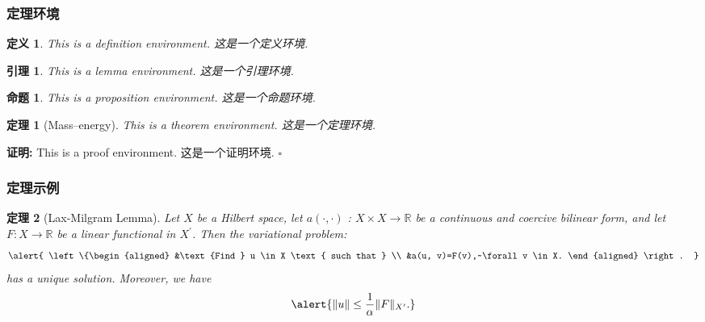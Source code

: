 \documentclass[notheorems,11pt,compress]{beamer}
\numberwithin{figure}{section}
\numberwithin{table}{section}
\numberwithin{equation}{section}
\theoremstyle{plain}
\newtheorem{theorem}{定理}
\numberwithin{theorem}{section}
\newtheorem{lemma}{引理}
\numberwithin{lemma}{section}
\numberwithin{corollary}{section}
\newtheorem{definition}{定义}
\numberwithin{definition}{section}
\newtheorem{proposition}{命题}
\numberwithin{proposition}{section}
\theoremstyle{example}
\renewenvironment{proof}[1][证明]{\par\textbf{#1:}%
\enspace\ignorespaces}{\par}
\newcommand{\QED}{\hfill\ensuremath{\square}}
\begin{document}
\begin{frame}
\frametitle{定理环境}
\begin{definition}
This is a definition environment. 这是一个定义环境.
\end{definition}


\begin{lemma}
This is a lemma environment. 这是一个引理环境.
\end{lemma}

\begin{proposition}
This is a proposition environment. 这是一个命题环境.
\end{proposition}

\begin{theorem}[Mass--energy]
This is a theorem environment. 这是一个定理环境.
\end{theorem}

\begin{proof}
  This is a proof environment. 这是一个证明环境. \QED
\end{proof}

\end{frame}


\begin{frame}
\frametitle{定理示例}

\begin{theorem}[Lax-Milgram Lemma]
Let $X$ be a Hilbert space, let $a(\cdot, \cdot)$ : $X \times X \rightarrow \mathbb{R}$ be a continuous and coercive bilinear form, and let $F : X \rightarrow \mathbb{R}$ be a linear functional in $X^{\prime}$. Then the variational problem:
\begin{equation}
  \alert{
  \left\{\begin{aligned}
  &\text {Find } u \in X \text { such that } \\
  &a(u, v)=F(v),~\forall v \in X.
  \end{aligned} \right. }
\end{equation}
has a unique solution. Moreover, we have
\begin{equation}
  \alert{ \|u\| \leq \frac{1}{\alpha}\|F\|_{X^{\prime}}. }
\end{equation}
\end{theorem}

\end{frame}

\end{document}
